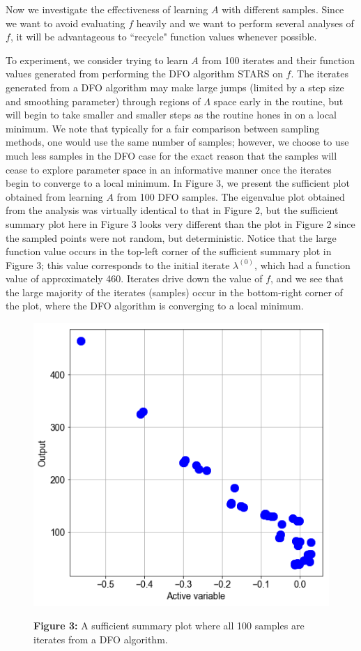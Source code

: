 \documentclass{amsart}
\begin{document}
Now we investigate the effectiveness of learning $A$ with different samples. Since we want to avoid evaluating $f$ heavily and we want to perform several analyses of $f$, it will be advantageous to ``recycle" function values whenever possible. 



To experiment, we consider trying to learn $A$ from 100 iterates and their function values generated from performing the DFO algorithm STARS \cite{CW} on $f$.  The iterates generated from a DFO algorithm may make large jumps (limited by a step size and smoothing parameter) through regions of $\Lambda$ space early in the routine, but will begin to take smaller and smaller steps as the routine hones in on a local minimum. We note that typically for a fair comparison between sampling methods, one would use the same number of samples; however, we choose to use much less samples in the DFO case for the exact reason that the samples will cease to explore parameter space in an informative manner once the iterates begin to converge to a local minimum. In Figure 3, we present the sufficient plot obtained from learning $A$ from 100 DFO samples. The eigenvalue plot obtained from the analysis was virtually identical to that in Figure 2, but the sufficient summary plot here in Figure 3 looks very different than the plot in Figure 2 since the sampled points were not random, but deterministic. Notice that the large function value occurs in the top-left corner of the sufficient summary plot in Figure 3; this value corresponds to the initial iterate $\lambda^{(0)}$, which had a function value of approximately 460. Iterates drive down the value of $f$, and we see that the large majority of the iterates (samples) occur in the bottom-right corner of the plot, where the DFO algorithm is converging to a local minimum.


\begin{figure} 
\includegraphics[scale=0.3]{suffsum.png}

\textbf{Figure 3:} A sufficient summary plot where all 100 samples are iterates from a DFO algorithm. 
\end{figure} 
\end{document}
